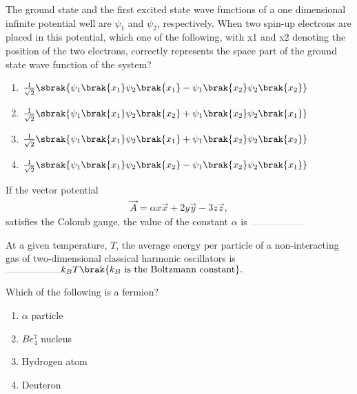 \item The ground state and the first excited state wave functions of a one dimensional infinite potential well are $\psi_1$ and $\psi_2$, respectively. When two spin-up electrons are placed in this potential, which one of the following, with x1 and x2 denoting the position of the two electrons, correctly represents the space part of the ground state wave function of the system?
\hfill{}
\begin{enumerate}
\item $\frac{1}{\sqrt{2}}\sbrak{\psi_1\brak{x_1}\psi_2\brak{x_1} - \psi_1\brak{x_2}\psi_2\brak{x_2}}$
\item $\frac{1}{\sqrt{2}}\sbrak{\psi_1\brak{x_1}\psi_2\brak{x_2} + \psi_1\brak{x_2}\psi_2\brak{x_1}}$
\item $\frac{1}{\sqrt{2}}\sbrak{\psi_1\brak{x_1}\psi_2\brak{x_1} + \psi_1\brak{x_2}\psi_2\brak{x_2}}$
\item $\frac{1}{\sqrt{2}}\sbrak{\psi_1\brak{x_1}\psi_2\brak{x_2} - \psi_1\brak{x_2}\psi_2\brak{x_1}}$
\end{enumerate}

\item If the vector potential
\begin{align*}
\vec{A} = \alpha x\vec{x} + 2y\vec{y} - 3z\vec{z},
\end{align*}
satisfies the Colomb gauge, the value of the constant $\alpha$ is $\rule{2cm}{0.1pt}$
\hfill{}

\item At a given temperature, $T$, the average energy per particle of a non-interacting gas of two-dimensional classical harmonic oscillators is $\rule{2cm}{0.1pt} k_{B}T\brak{k_B \text{ is the Boltzmann constant}}.$
\hfill{}

\item Which of the following is a fermion?
\hfill{}
\begin{enumerate}
\item $\alpha$ particle
\item $Be_{4}^{7}$ nucleus
\item Hydrogen atom
\item Deuteron
\end{enumerate}

